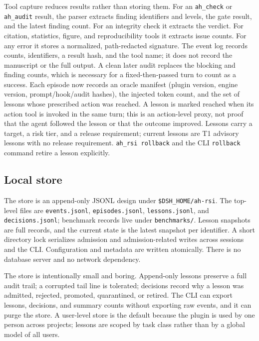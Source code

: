 Tool capture reduces results rather than storing them. For an \texttt{ah\_check} or \texttt{ah\_audit} result, the parser extracts finding identifiers and levels, the gate result, and the latest finding count. For an integrity check it extracts the verdict. For citation, statistics, figure, and reproducibility tools it extracts issue counts. For any error it stores a normalized, path-redacted signature. The event log records counts, identifiers, a result hash, and the tool name; it does not record the manuscript or the full output. A clean later audit replaces the blocking and finding counts, which is necessary for a fixed-then-passed turn to count as a success. Each episode now records an oracle manifest (plugin version, engine version, prompt/hook/audit hashes), the injected token count, and the set of lessons whose prescribed action was reached. A lesson is marked reached when its action tool is invoked in the same turn; this is an action-level proxy, not proof that the agent followed the lesson or that the outcome improved. Lessons carry a target, a risk tier, and a release requirement; current lessons are T1 advisory lessons with no release requirement. \texttt{ah\_rsi rollback} and the CLI \texttt{rollback} command retire a lesson explicitly.

\subsection{Local store}
\label{sec:store}
The store is an append-only JSONL design under \texttt{\$DSH\_HOME/ah-rsi}. The top-level files are \texttt{events.jsonl}, \texttt{episodes.jsonl}, \texttt{lessons.jsonl}, and \texttt{decisions.jsonl}; benchmark records live under \texttt{benchmarks/}. Lesson snapshots are full records, and the current state is the latest snapshot per identifier. A short directory lock serializes admission and admission-related writes across sessions and the CLI. Configuration and metadata are written atomically. There is no database server and no network dependency.

The store is intentionally small and boring. Append-only lessons preserve a full audit trail; a corrupted tail line is tolerated; decisions record why a lesson was admitted, rejected, promoted, quarantined, or retired. The CLI can export lessons, decisions, and summary counts without exporting raw events, and it can purge the store. A user-level store is the default because the plugin is used by one person across projects; lessons are scoped by task class rather than by a global model of all users.

